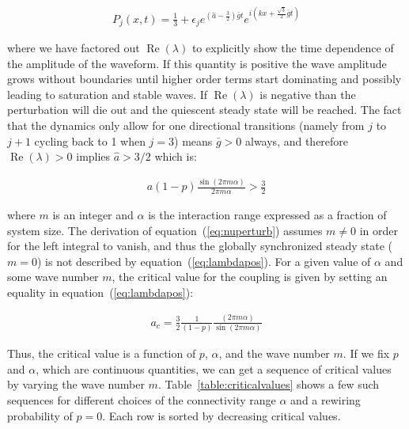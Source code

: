 \begin{align}
  P_j(x,t) = \frac{1}{3} + \epsilon_j e^{\left( \hat{a} - \frac{3}{2} \right)\bar{g}t} e^{i\left(kx + \frac{\sqrt{3}}{2}\bar{g}t\right)}
\end{align}

\noindent where we have factored out $\operatorname{Re}(\lambda)$ to explicitly show the time dependence of the amplitude of the
waveform. If this quantity is positive the wave amplitude grows without boundaries until higher order terms start dominating and
possibly leading to saturation and stable waves. If $\operatorname{Re}(\lambda)$ is negative than the perturbation will die out and the
quiescent steady state will be reached. The fact that the dynamics only allow for one directional transitions (namely from $j$ to $j+1$
cycling back to 1 when $j=3$) means $\bar{g}>0$ always, and therefore $\operatorname{Re}(\lambda)>0$ implies $\hat{a} > 3/2$ which is:

\begin{align}
  a(1-p)\frac{\sin(2\pi m\alpha)}{2\pi m\alpha} > \frac{3}{2}
  \label{eq:lambdapos}
\end{align}

\noindent where $m$ is an integer and $\alpha$ is the interaction range expressed as a fraction of system size. The derivation of
equation~(\ref{eq:nuperturb}) assumes $m\neq 0$ in order for the left integral to vanish, and thus the globally synchronized steady
state ($m=0$) is not described by equation~(\ref{eq:lambdapos}). For a given value of $\alpha$ and some wave number $m$, the critical
value for the coupling is given by setting an equality in equation~(\ref{eq:lambdapos}):

\begin{align}
  a_c = \frac{3}{2}\frac{1}{(1-p)}\frac{(2\pi m\alpha)}{\sin(2\pi m\alpha)}
\end{align}

Thus, the critical value is a function of $p$, $\alpha$, and the wave number $m$. If we fix $p$ and $\alpha$, which are continuous
quantities, we can get a sequence of critical values by varying the wave number $m$. Table~\ref{table:criticalvalues} shows a few such
sequences for different choices of the connectivity range $\alpha$ and a rewiring probability of $p=0$. Each row is sorted by
decreasing critical values.

\newcommand{\cc}{\cellcolor}

